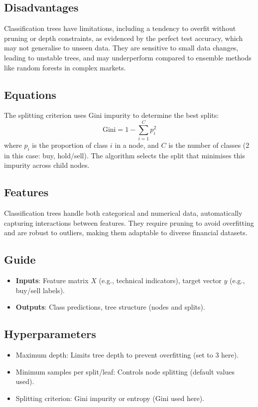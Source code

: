 \documentclass{article}
\begin{document}
\subsection{Disadvantages}
Classification trees have limitations, including a tendency to overfit without pruning or depth constraints, as evidenced by the perfect test accuracy, which may not generalise to unseen data. They are sensitive to small data changes, leading to unstable trees, and may underperform compared to ensemble methods like random forests in complex markets.

\subsection{Equations}
The splitting criterion uses Gini impurity to determine the best splits:
\[
\text{Gini} = 1 - \sum_{i=1}^C p_i^2
\]
where \(p_i\) is the proportion of class \(i\) in a node, and \(C\) is the number of classes (2 in this case: buy, hold/sell). The algorithm selects the split that minimises this impurity across child nodes.

\subsection{Features}
Classification trees handle both categorical and numerical data, automatically capturing interactions between features. They require pruning to avoid overfitting and are robust to outliers, making them adaptable to diverse financial datasets.

\subsection{Guide}
\begin{itemize}
    \item \textbf{Inputs}: Feature matrix \(X\) (e.g., technical indicators), target vector \(y\) (e.g., buy/sell labels).
    \item \textbf{Outputs}: Class predictions, tree structure (nodes and splits).
\end{itemize}

\subsection{Hyperparameters}
\begin{itemize}
    \item Maximum depth: Limits tree depth to prevent overfitting (set to 3 here).
    \item Minimum samples per split/leaf: Controls node splitting (default values used).
    \item Splitting criterion: Gini impurity or entropy (Gini used here).
\end{itemize}
\end{document}
